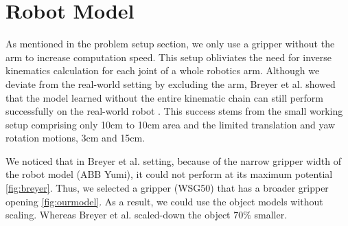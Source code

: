 \section{Robot Model}
As mentioned in the problem setup section, we only use a gripper without the arm to increase computation speed. This setup obliviates the need for inverse kinematics calculation for each joint of a whole robotics arm. Although we deviate from the real-world setting by excluding the arm, Breyer et al. showed that the model learned without the entire kinematic chain can still perform successfully on the real-world robot \cite{Breyer2018}. This success stems from the small working setup comprising only 10cm to 10cm area and the limited translation and yaw rotation motions, 3cm and 15cm.

We noticed that in Breyer et al. setting, because of the narrow gripper width of the robot model (ABB Yumi), it could not perform at its maximum potential \ref{fig:breyer}. Thus, we selected a gripper (WSG50) that has a broader gripper opening \ref{fig:ourmodel}. As a result, we could use the object models without scaling. Whereas Breyer et al. scaled-down the object \(70\%\) smaller.

